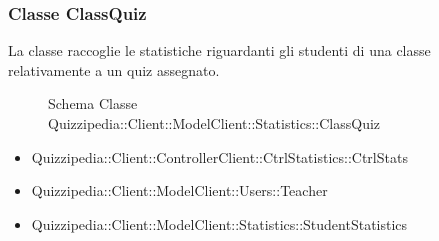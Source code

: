 \subsubsection{Classe ClassQuiz}
La classe raccoglie le statistiche riguardanti gli studenti di una classe relativamente a un quiz assegnato.
\begin{figure}[H]
\centering
\noindent{}
\caption[Schema Classe ClassQuiz]{Schema Classe Quizzipedia::Client::ModelClient::Statistics::ClassQuiz}
\end{figure}
\begin{itemize}
\item Quizzipedia::Client::ControllerClient::CtrlStatistics::CtrlStats
\item Quizzipedia::Client::ModelClient::Users::Teacher
\end{itemize}
\begin{itemize}
\item Quizzipedia::Client::ModelClient::Statistics::StudentStatistics
\end{itemize}
